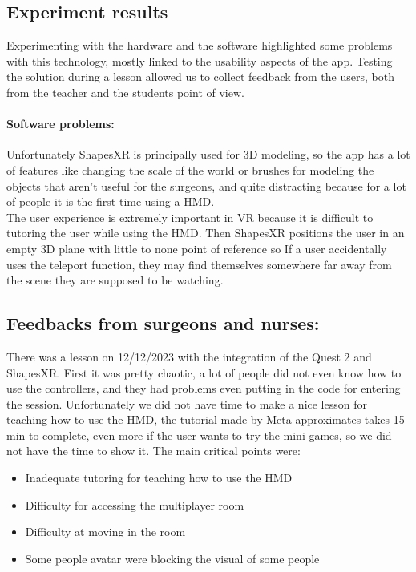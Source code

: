 \subsection{Experiment results}
\noindent
Experimenting with the hardware and the software highlighted some problems with this technology, mostly linked to the usability aspects of the app. Testing the solution during a lesson allowed us to collect feedback from the users, both from the teacher and the students point of view.

\paragraph{Software problems:}
Unfortunately ShapesXR is principally used for 3D modeling, so the app has a lot of features like changing the scale of the world or brushes for modeling the objects that aren't useful for the surgeons,
and quite distracting because for a lot of people it is the first time using a \ac{HMD}.\\
The user experience is extremely important in \ac{VR} because it is difficult to tutoring the user while using the \ac{HMD}.
Then ShapesXR positions the user in an empty 3D plane with little to none point of reference so If a user accidentally uses the teleport function, they may find themselves somewhere far away from the scene they are supposed to be watching.

\subsection{Feedbacks from surgeons and nurses:}
\noindent
There was a lesson on 12/12/2023 with the integration of the Quest 2 and ShapesXR. First it was pretty chaotic, a lot of people did not even know how to use the controllers,
and they had problems even putting in the code for entering the session. Unfortunately we did not have time to make a nice lesson for teaching how to use the HMD,
the tutorial made by Meta approximates takes 15 min to complete, even more if the user wants to try the mini-games, so we did not have the time to show it. The main critical points were: 


\begin{itemize}
  \item Inadequate tutoring for teaching how to use the \ac{HMD}
  \item Difficulty for accessing the multiplayer room
  \item Difficulty at moving in the room
  \item Some people avatar were blocking the visual of some people
\end{itemize}


